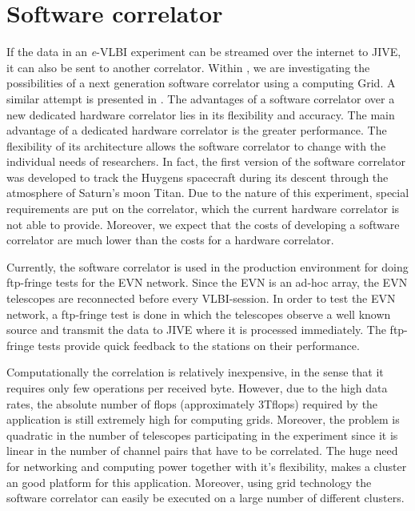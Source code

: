 \section{Software correlator}\label{sec:softwarecorrelation}
If the data in an {\it e}-VLBI experiment can be streamed over the
internet to JIVE, it can also be sent to another correlator. Within
\scarie, we are investigating the possibilities of a next generation
software correlator using a computing Grid. A similar attempt is
presented in \cite{deller-2007}. The advantages of a software
correlator over a new dedicated hardware correlator lies in its
flexibility and accuracy. The main advantage of a dedicated hardware
correlator is the greater performance. The flexibility of its
architecture allows the software correlator to change with the
individual needs of researchers. In fact, the first version of the
software correlator was developed to track the Huygens spacecraft
during its descent through the atmosphere of Saturn's moon Titan. Due
to the nature of this experiment, special requirements are put on the
correlator, which the current hardware correlator is not able to
provide.  Moreover, we expect that the costs of developing a software
correlator are much lower than the costs for a hardware correlator.

Currently, the software correlator is used in the production
environment for doing ftp-fringe tests for the EVN network. Since the
EVN is an ad-hoc array, the EVN telescopes are reconnected before
every VLBI-session. In order to test the EVN network, a ftp-fringe
test is done in which the telescopes observe a well known source and
transmit the data to JIVE where it is processed immediately. The
ftp-fringe tests provide quick feedback to the stations on their
performance.

Computationally the correlation is relatively inexpensive, in the
sense that it requires only few operations per received byte.
However, due to the high data rates, the absolute number of flops
(approximately 3Tflops) required by the application is still extremely
high for computing grids.  Moreover, the problem is quadratic in the
number of telescopes participating in the experiment since it is
linear in the number of channel pairs that have to be correlated. The
huge need for networking and computing power together with it's
flexibility, makes a cluster an good platform for this
application. Moreover, using grid technology the software correlator
can easily be executed on a large number of different clusters.



